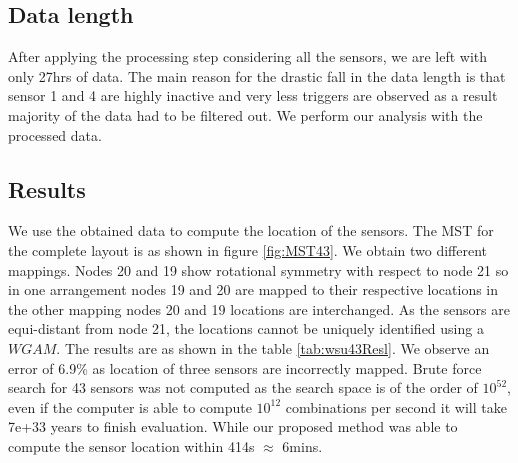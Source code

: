 \subsection{Data length}
After applying the processing step considering all the sensors, we are left with only 27hrs of data. The main reason for the drastic fall in the data length is that sensor  1 and 4 are highly inactive and very less triggers are observed as a result majority of the data had to be filtered out. We perform our analysis with the processed data.


\subsection{Results}

We use the obtained data to compute the location of the sensors. The MST for the complete layout is as shown in figure \ref{fig:MST43}. We obtain two different mappings. 
Nodes 20 and 19 show rotational symmetry with respect to node 21 so in one arrangement nodes 19 and 20 are mapped to their respective locations in the other mapping nodes 20 and 19 locations are interchanged. As the sensors are equi-distant from node 21, the locations cannot be uniquely identified using a $WGAM$. 
The results are as shown in the table \ref{tab:wsu43Resl}. We observe an error of 6.9\% as location of three sensors are incorrectly mapped.
Brute force search for 43 sensors was not computed as the search space is of the order of $10^{52}$, even if the computer is able to compute $10^{12}$ combinations per second it will take 7e+33 years to finish evaluation.
While our proposed method was able to compute the sensor location within 414s $\approx$ 6mins. 
  
  

